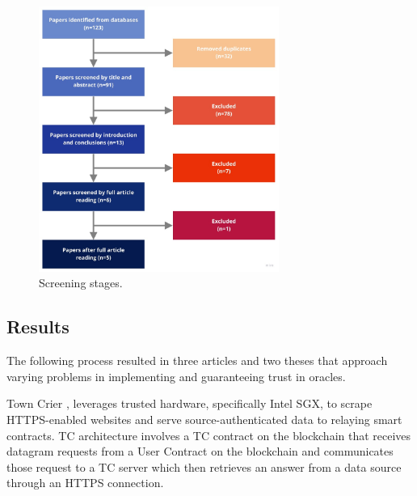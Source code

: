 

\begin{figure}[t]
  \begin{center}
    \leavevmode
    \includegraphics[width=0.7\textwidth]{figures/paper-screening.jpg}
    \caption{Screening stages.}
    \label{fig:/figures/paper-screening}
  \end{center}
\end{figure}


\subsection{Results}

The following process resulted in three articles and two theses that approach varying problems in implementing and guaranteeing trust in oracles.

Town Crier \cite{Zhang2016TownCrier}, leverages trusted hardware, specifically Intel SGX, to scrape HTTPS-enabled websites and serve source-authenticated data to relaying smart contracts. TC architecture involves a TC contract on the blockchain that receives datagram requests from a User Contract on the blockchain and communicates those request to a TC server which then retrieves an answer from a data source through an HTTPS connection.

